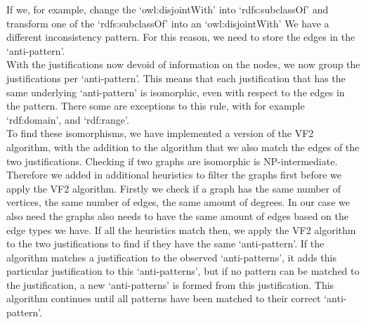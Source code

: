 \documentclass[11pt,letterpaper ,oneside ]{book}
\begin{document}
	If we, for example, change the `owl:disjointWith' into `rdfs:subclassOf' and transform one of the `rdfs:subclassOf' into an `owl:disjointWith' We have a different inconsistency pattern. For this reason, we need to store the edges in the `anti-pattern'.\\
	With the justifications now devoid of information on the nodes, we now group the justifications per `anti-pattern'. This means that each justification that has the same underlying `anti-pattern' is isomorphic, even with respect to the edges in the pattern. There some are exceptions to this rule, with for example `rdf:domain', and `rdf:range'.\\
	To find these isomorphisms, we have implemented a version of the VF2 algorithm\cite{LCordella:2004}, with the addition to the algorithm that we also match the edges of the two justifications. Checking if two graphs are isomorphic is NP-intermediate. Therefore we added in additional heuristics to filter the graphs first before we apply the VF2 algorithm. Firstly we check if a graph has the same number of vertices, the same number of edges, the same amount of degrees. In our case we also need the graphs also needs to have the same amount of edges based on the edge types we have. If all the heuristics match then, we apply the VF2 algorithm to the two justifications to find if they have the same `anti-pattern'. If the algorithm matches a justification to the observed `anti-patterns', it adds this particular justification to this `anti-patterns', but if no pattern can be matched to the justification, a new `anti-patterns' is formed from this justification. This algorithm continues until all patterns have been matched to their correct `anti-pattern'.\\
	
\end{document}
